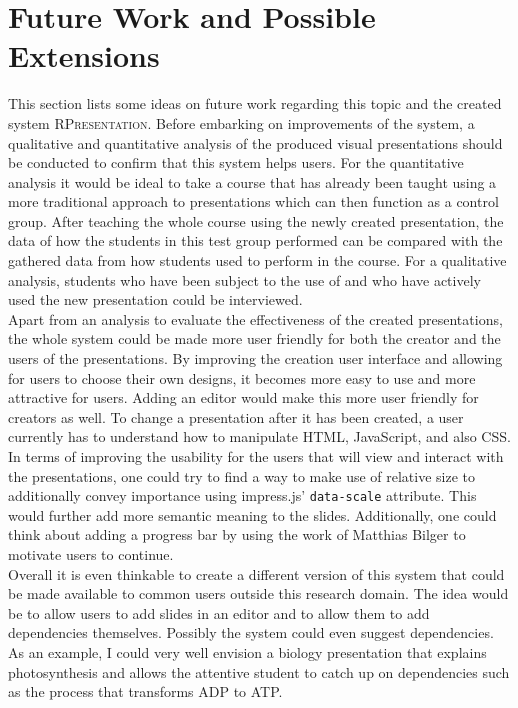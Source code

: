 \documentclass[twoside, 12pt]{article}
\newcommand{\sys}{\textsc{RPresentation}\xspace}
\begin{document}
\section{Future Work and Possible Extensions}

This section lists some ideas on future work regarding this topic and the created system \sys. Before embarking on improvements of the system, a qualitative and quantitative analysis of the produced visual presentations should be conducted to confirm that this system helps users. For the quantitative analysis it would be ideal to take a course that has already been taught using a more traditional approach to presentations which can then function as a control group. After teaching the whole course using the newly created presentation, the data of how the students in this test group performed can be compared with the gathered data from how students used to perform in the course. For a qualitative analysis, students who have been subject to the use of and who have actively used the new presentation could be interviewed.\\

Apart from an analysis to evaluate the effectiveness of the created presentations, the whole system could be made more user friendly for both the creator and the users of the presentations. By improving the creation user interface and allowing for users to choose their own designs, it becomes more easy to use and more attractive for users. Adding an editor would make this more user friendly for creators as well. To change a presentation after it has been created, a user currently has to understand how to manipulate HTML, JavaScript, and also CSS.\\

In terms of improving the usability for the users that will view and interact with the presentations, one could try to find a way to make use of relative size to additionally convey importance using impress.js' \texttt{data-scale} attribute. This would further add more semantic meaning to the slides. Additionally, one could think about adding a progress bar by using the work of Matthias Bilger \cite{bilger:npentrel15} to motivate users to continue.\\

Overall it is even thinkable to create a different version of this system that could be made available to common users outside this research domain. The idea would be to allow users to add slides in an editor and to allow them to add dependencies themselves. Possibly the system could even suggest dependencies. As an example, I could very well envision a biology presentation that explains photosynthesis and allows the attentive student to catch up on dependencies such as the process that transforms ADP to ATP.\\
\end{document}
